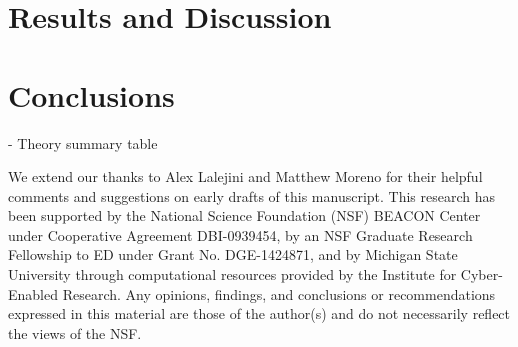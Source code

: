 \section{Results and Discussion}

\subsection{}

\section{Conclusions}

- Theory summary table

\begin{acks}
We extend our thanks to Alex Lalejini and Matthew Moreno for their helpful comments and suggestions on early drafts of this manuscript. This research has been supported by the National Science Foundation (NSF) BEACON Center under Cooperative Agreement DBI-0939454, by an NSF Graduate Research Fellowship to ED under Grant No. DGE-1424871, and by Michigan State University through computational resources provided by the Institute for Cyber-Enabled Research. Any opinions, findings, and conclusions or recommendations expressed in this material are those of the author(s) and do not necessarily reflect the views of the NSF.
\end{acks}




